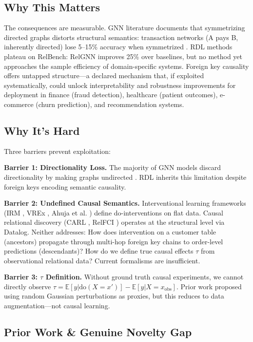 \documentclass[11pt,letterpaper]{article}
\begin{document}
\subsection{Why This Matters}

The consequences are measurable. GNN literature documents that symmetrizing directed graphs distorts structural semantics: transaction networks (A pays B, inherently directed) lose 5--15\% accuracy when symmetrized \cite{Chen2023}. RDL methods plateau on RelBench: RelGNN improves 25\% over baselines, but no method yet approaches the sample efficiency of domain-specific systems. Foreign key causality offers untapped structure---a declared mechanism that, if exploited systematically, could unlock interpretability and robustness improvements for deployment in finance (fraud detection), healthcare (patient outcomes), e-commerce (churn prediction), and recommendation systems.

\subsection{Why It's Hard}

Three barriers prevent exploitation:

\textbf{Barrier 1: Directionality Loss.} The majority of GNN models discard directionality by making graphs undirected \cite{Wang2024}. RDL inherits this limitation despite foreign keys encoding semantic causality.

\textbf{Barrier 2: Undefined Causal Semantics.} Interventional learning frameworks (IRM \cite{Arjovsky2019}, VREx \cite{Krueger2021}, Ahuja et al. \cite{Ahuja2023}) define do-interventions on flat data. Causal relational discovery (CARL \cite{Salimi2020}, RelFCI \cite{Negro2025}) operates at the structural level via Datalog. Neither addresses: How does intervention on a customer table (ancestors) propagate through multi-hop foreign key chains to order-level predictions (descendants)? How do we define true causal effects $\tau$ from observational relational data? Current formalisms are insufficient.

\textbf{Barrier 3: $\tau$ Definition.} Without ground truth causal experiments, we cannot directly observe $\tau = \mathbb{E}[y|\text{do}(X=x')] - \mathbb{E}[y|X=x_{\text{obs}}]$. Prior work \cite{Previous2026} proposed using random Gaussian perturbations as proxies, but this reduces to data augmentation---not causal learning.

\subsection{Prior Work \& Genuine Novelty Gap}
\end{document}
